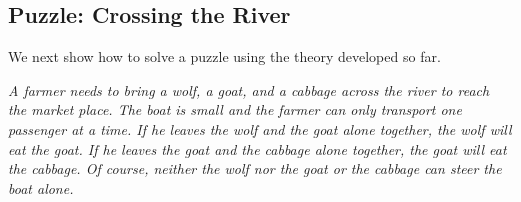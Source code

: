 \subsection{Puzzle: Crossing the River}
We next show how to solve a puzzle using the theory developed so far.
\vspace*{0.3cm}

\begin{minipage}[c]{14cm}
{\sl
A farmer needs to bring a wolf, a goat, and a cabbage across the river to reach the market
place.  The boat is small and the farmer can only transport one passenger at a time.
If he leaves the wolf and the goat alone together, the wolf will eat the goat.
If he leaves the goat and the cabbage alone together, the goat will eat the cabbage.
Of course, neither the wolf nor the goat or the cabbage can steer the boat alone.
}
\end{minipage}
\vspace*{0.3cm}

